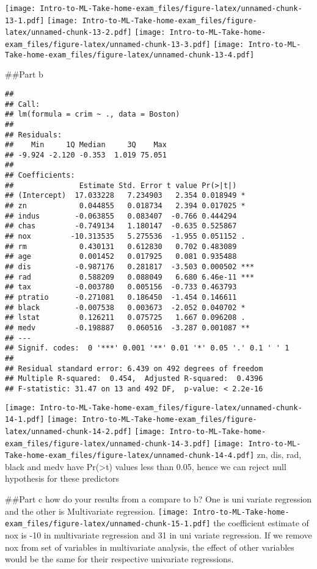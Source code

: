 \documentclass[
]{article}
\begin{document}
\texttt{[image: Intro-to-ML-Take-home-exam\_files/figure-latex/unnamed-chunk-13-1.pdf]}
\texttt{[image: Intro-to-ML-Take-home-exam\_files/figure-latex/unnamed-chunk-13-2.pdf]}
\texttt{[image: Intro-to-ML-Take-home-exam\_files/figure-latex/unnamed-chunk-13-3.pdf]}
\texttt{[image: Intro-to-ML-Take-home-exam\_files/figure-latex/unnamed-chunk-13-4.pdf]}

\#\#Part b

\begin{verbatim}
## 
## Call:
## lm(formula = crim ~ ., data = Boston)
## 
## Residuals:
##    Min     1Q Median     3Q    Max 
## -9.924 -2.120 -0.353  1.019 75.051 
## 
## Coefficients:
##               Estimate Std. Error t value Pr(>|t|)    
## (Intercept)  17.033228   7.234903   2.354 0.018949 *  
## zn            0.044855   0.018734   2.394 0.017025 *  
## indus        -0.063855   0.083407  -0.766 0.444294    
## chas         -0.749134   1.180147  -0.635 0.525867    
## nox         -10.313535   5.275536  -1.955 0.051152 .  
## rm            0.430131   0.612830   0.702 0.483089    
## age           0.001452   0.017925   0.081 0.935488    
## dis          -0.987176   0.281817  -3.503 0.000502 ***
## rad           0.588209   0.088049   6.680 6.46e-11 ***
## tax          -0.003780   0.005156  -0.733 0.463793    
## ptratio      -0.271081   0.186450  -1.454 0.146611    
## black        -0.007538   0.003673  -2.052 0.040702 *  
## lstat         0.126211   0.075725   1.667 0.096208 .  
## medv         -0.198887   0.060516  -3.287 0.001087 ** 
## ---
## Signif. codes:  0 '***' 0.001 '**' 0.01 '*' 0.05 '.' 0.1 ' ' 1
## 
## Residual standard error: 6.439 on 492 degrees of freedom
## Multiple R-squared:  0.454,  Adjusted R-squared:  0.4396 
## F-statistic: 31.47 on 13 and 492 DF,  p-value: < 2.2e-16
\end{verbatim}

\texttt{[image: Intro-to-ML-Take-home-exam\_files/figure-latex/unnamed-chunk-14-1.pdf]}
\texttt{[image: Intro-to-ML-Take-home-exam\_files/figure-latex/unnamed-chunk-14-2.pdf]}
\texttt{[image: Intro-to-ML-Take-home-exam\_files/figure-latex/unnamed-chunk-14-3.pdf]}
\texttt{[image: Intro-to-ML-Take-home-exam\_files/figure-latex/unnamed-chunk-14-4.pdf]}
zn, dis, rad, black and medv have Pr(\textgreater\textbar t\textbar)
values less than 0.05, hence we can reject null hypothesis for these
predictors

\#\#Part c how do your results from a compare to b? One is uni variate
regression and the other is Multivariate regression.
\texttt{[image: Intro-to-ML-Take-home-exam\_files/figure-latex/unnamed-chunk-15-1.pdf]}
the coefficient estimate of nox is -10 in multivariate regression and 31
in uni variate regression. If we remove nox from set of variables in
multivariate analysis, the effect of other variables would be the same
for their respective univariate regressions.
\end{document}
